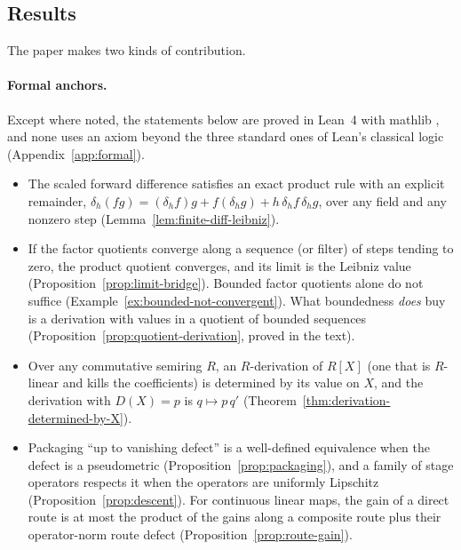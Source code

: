 \subsection{Results}
The paper makes two kinds of contribution.

\paragraph{Formal anchors.}
Except where noted, the statements below are proved in Lean~4 with mathlib \cite{moura2021lean4,mathlib2020lean}, and none uses an axiom beyond the three standard ones of Lean's classical logic (Appendix~\ref{app:formal}).
\begin{itemize}
  \item The scaled forward difference satisfies an exact product rule with an explicit remainder, $\delta_h(fg)=(\delta_h f)g+f(\delta_h g)+h\,\delta_h f\,\delta_h g$, over any field and any nonzero step (Lemma~\ref{lem:finite-diff-leibniz}).
  \item If the factor quotients converge along a sequence (or filter) of steps tending to zero, the product quotient converges, and its limit is the Leibniz value (Proposition~\ref{prop:limit-bridge}). Bounded factor quotients alone do not suffice (Example~\ref{ex:bounded-not-convergent}). What boundedness \emph{does} buy is a derivation with values in a quotient of bounded sequences (Proposition~\ref{prop:quotient-derivation}, proved in the text).
  \item Over any commutative semiring $R$, an $R$-derivation of $R[X]$ (one that is $R$-linear and kills the coefficients) is determined by its value on $X$, and the derivation with $D(X)=p$ is $q\mapsto p\,q'$ (Theorem~\ref{thm:derivation-determined-by-X}).
  \item Packaging ``up to vanishing defect'' is a well-defined equivalence when the defect is a pseudometric (Proposition~\ref{prop:packaging}), and a family of stage operators respects it when the operators are uniformly Lipschitz (Proposition~\ref{prop:descent}). For continuous linear maps, the gain of a direct route is at most the product of the gains along a composite route plus their operator-norm route defect (Proposition~\ref{prop:route-gain}).
\end{itemize}

